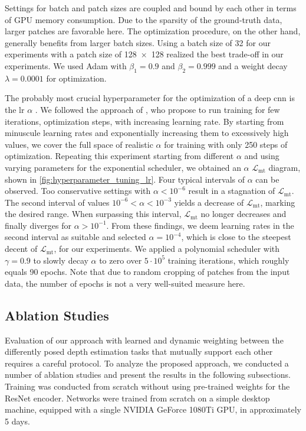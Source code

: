 \documentclass[lang=english]{tumarxivarticle}
\newcommand{\citep}{\parencite}
\newcommand{\citet}{\textcite}
\newcommand{\loss}{\ensuremath{\mathcal{L}}}
\begin{document}
Settings for batch and patch sizes are coupled and bound by each other in terms of GPU memory consumption.
Due to the sparsity of the ground-truth data, larger patches are favorable here.
The optimization procedure, on the other hand, generally benefits from larger batch sizes.
Using a batch size of \num{32} for our experiments with a patch size of \SI{128x128}{\pixel} realized the best trade-off in our experiments.
We used Adam \citep{Kingma15} with $\beta_1 = 0.9$ and $\beta_2 = 0.999$ and a weight decay $\lambda = 0.0001$ for optimization.

The probably most crucial hyperparameter for the optimization of a deep \gls{cnn} is the \gls{lr} $\alpha$ \citep{Smith17}.
We followed the approach of \citet{Smith17}, who propose to run training for few iterations, \ie optimization steps, with increasing learning rate.
By starting from minuscule learning rates and exponentially increasing them to excessively high values, we cover the full space of realistic $\alpha$ for training with only \num{250} steps of optimization.
Repeating this experiment starting from different $\alpha$ and using varying parameters for the exponential scheduler, we obtained an $\alpha$ \vs $\loss_\text{mt}$ diagram, shown in \cref{fig:hyperparameter_tuning_lr}.
Four typical intervals of $\alpha$ can be observed.
Too conservative settings with $\alpha < 10^{-6}$ result in a stagnation of $\loss_\text{mt}$.
The second interval of values $10^{-6} < \alpha < 10^{-3}$ yields a decrease of $\loss_\text{mt}$, marking the desired range.
When surpassing this interval, $\loss_\text{mt}$ no longer decreases and finally diverges for $\alpha > 10^{-1}$.
From these findings, we deem learning rates in the second interval as suitable and selected $\alpha = 10^{-4}$, which is close to the steepest decent of $\loss_\text{mt}$, for our experiments.
We applied a polynomial scheduler with $\gamma = 0.9$ to slowly decay $\alpha$ to zero over $5 \cdot 10^5$ training iterations, which roughly equals \num{90} epochs.
Note that due to random cropping of patches from the input data, the number of epochs is not a very well-suited measure here.


\subsection{Ablation Studies}
\label{subsec:ablation_studies}

Evaluation of our approach with learned and dynamic weighting between the differently posed depth estimation tasks that mutually support each other requires a careful protocol.
To analyze the proposed approach, we conducted a number of ablation studies and present the results in the following subsections.
Training was conducted from scratch without using pre-trained weights for the ResNet encoder.
Networks were trained from scratch on a simple desktop machine, equipped with a single NVIDIA GeForce 1080Ti GPU, in approximately 5 days.
\end{document}
